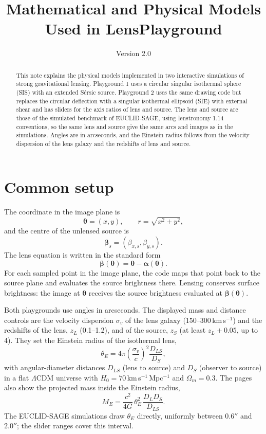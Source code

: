 \documentclass[11pt,a4paper]{article}
\title{Mathematical and Physical Models Used in LensPlayground}
\author{}
\date{Version 2.0}
\newcommand{\be}{\boldsymbol{\beta}}
\newcommand{\thv}{\boldsymbol{\theta}}
\newcommand{\al}{\boldsymbol{\alpha}}
\begin{document}
\maketitle

\begin{abstract}
This note explains the physical models implemented in two interactive simulations of strong gravitational lensing. Playground 1 uses a circular singular isothermal sphere (SIS) with an extended S\'ersic source. Playground 2 uses the same drawing code but replaces the circular deflection with a singular isothermal ellipsoid (SIE) with external shear and has sliders for the axis ratios of lens and source. The lens and source are those of the simulated benchmark of EUCLID-SAGE, using lenstronomy 1.14 conventions, so the same lens and source give the same arcs and images as in the simulations. Angles are in arcseconds, and the Einstein radius follows from the velocity dispersion of the lens galaxy and the redshifts of lens and source.
\end{abstract}

\section{Common setup}
The coordinate in the image plane is
\begin{equation}
  \thv=(x,y), \qquad r=\sqrt{x^2+y^2},
\end{equation}
and the centre of the unlensed source is
\begin{equation}
  \be_s=(\beta_{x,s},\beta_{y,s}).
\end{equation}
The lens equation is written in the standard form
\begin{equation}
  \be(\thv)=\thv-\al(\thv).
\end{equation}
For each sampled point in the image plane, the code maps that point back to the source plane and evaluates the source brightness there. Lensing conserves surface brightness: the image at $\thv$ receives the source brightness evaluated at $\be(\thv)$.

Both playgrounds use angles in arcseconds. The displayed mass and distance controls are the velocity dispersion $\sigma_v$ of the lens galaxy (150--300\,km\,s$^{-1}$) and the redshifts of the lens, $z_L$ (0.1--1.2), and of the source, $z_S$ (at least $z_L+0.05$, up to 4). They set the Einstein radius of the isothermal lens,
\begin{equation}
  \theta_E=4\pi\left(\frac{\sigma_v}{c}\right)^2\frac{D_{LS}}{D_S},
  \label{eq:thetaE}
\end{equation}
with angular-diameter distances $D_{LS}$ (lens to source) and $D_S$ (observer to source) in a flat $\Lambda$CDM universe with $H_0=70$\,km\,s$^{-1}$\,Mpc$^{-1}$ and $\Omega_m=0.3$. The pages also show the projected mass inside the Einstein radius,
\begin{equation}
  M_E=\frac{c^2}{4G}\,\theta_E^2\,\frac{D_L D_S}{D_{LS}} .
\end{equation}
The EUCLID-SAGE simulations draw $\theta_E$ directly, uniformly between $0.6''$ and $2.0''$; the slider ranges cover this interval.
\end{document}
